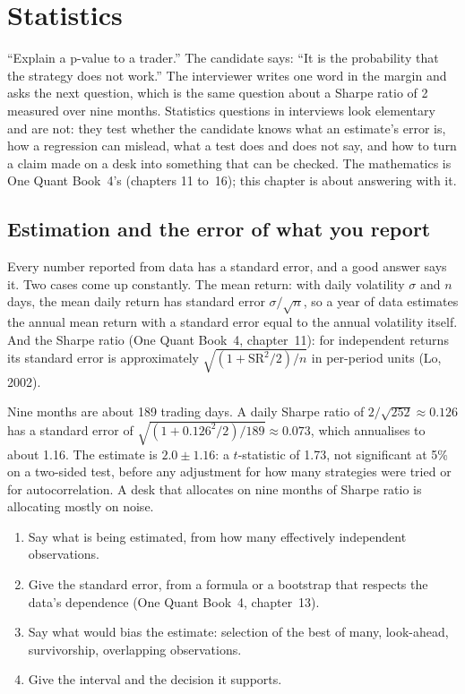 \chapter{Statistics}\label{ch:iv:statistics}

``Explain a p-value to a trader.'' The candidate says: ``It is the probability that the strategy does not work.''
The interviewer writes one word in the margin and asks the next question, which is the same question about a
Sharpe ratio of 2 measured over nine months. Statistics questions in interviews look elementary and are not:
they test whether the candidate knows what an estimate's error is, how a regression can mislead, what a test does
and does not say, and how to turn a claim made on a desk into something that can be checked. The mathematics is
One Quant Book~4's (chapters 11 to~16); this chapter is about answering with it.

\section{Estimation and the error of what you report}

Every number reported from data has a standard error, and a good answer says it. Two cases come up constantly.
The mean return: with daily volatility $\sigma$ and $n$ days, the mean daily return has standard error
$\sigma/\sqrt n$, so a year of data estimates the annual mean return with a standard error equal to the annual
volatility itself. And the Sharpe ratio (One Quant Book~4, chapter~11): for independent returns its standard
error is approximately $\sqrt{(1 + \mathrm{SR}^2/2)/n}$ in per-period units (Lo, 2002).

\begin{example}\label{ex:iv:statistics:sharpe}
Nine months are about 189 trading days. A daily Sharpe ratio of $2/\sqrt{252} \approx 0.126$ has a standard error
of $\sqrt{(1 + 0.126^2/2)/189} \approx 0.073$, which annualises to about 1.16. The estimate is $2.0 \pm 1.16$: a
$t$-statistic of 1.73, not significant at 5\% on a two-sided test, before any adjustment for how many strategies
were tried or for autocorrelation. A desk that allocates on nine months of Sharpe ratio is allocating mostly on noise.
\end{example}

\begin{method}\label{met:iv:statistics:estimate}
\begin{enumerate}
\item Say what is being estimated, from how many effectively independent observations.
\item Give the standard error, from a formula or a bootstrap that respects the data's dependence (One Quant
Book~4, chapter~13).
\item Say what would bias the estimate: selection of the best of many, look-ahead, survivorship, overlapping
observations.
\item Give the interval and the decision it supports.
\end{enumerate}
\end{method}

